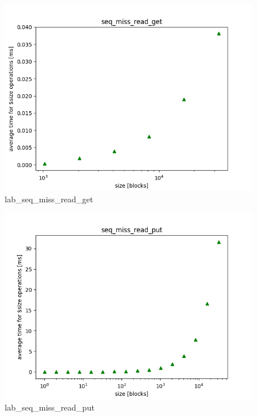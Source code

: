 \documentclass[twocolumn,11pt]{article}
\begin{document}
\begin{figure}[H]
  \includegraphics[width=\linewidth]{Pictures/LABPC/seq_miss_read_complete_get.png}
  \caption{lab\_seq\_miss\_read\_get}
  \label{fig:lab_seq_miss_read_get}
\end{figure}
\begin{figure}[H]
  \includegraphics[width=\linewidth]{Pictures/LABPC/seq_miss_read_complete_put.png}
  \caption{lab\_seq\_miss\_read\_put}
  \label{fig:lab_seq_miss_read_put}
\end{figure}
\end{document}
